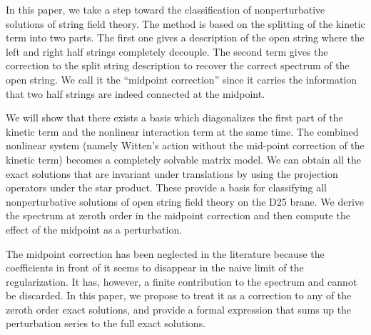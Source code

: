 \documentclass[a4paper,aps,preprint,nofootinbib,eqsecnum]{revtex4}
\begin{document}
In this paper, we take a step toward the classification of
nonperturbative solutions of string field theory. The method is
based on the splitting of the kinetic term into two parts. The
first one gives a description of the open string where the left
and right half strings completely decouple. The second term gives
the correction to the split string description to recover the
correct spectrum of the open string. We call it the ``midpoint
correction'' since it carries the information that two half
strings are indeed connected at the midpoint.

We will show that there exists a basis which diagonalizes the first part of
the kinetic term and the nonlinear interaction term at the same time. The
combined nonlinear system (namely Witten's action without the mid-point
correction of the kinetic term) becomes a completely solvable matrix model.
We can obtain all the exact solutions that are invariant under translations
by using the projection operators under the star product. These provide a
basis for classifying all nonperturbative solutions of open string field
theory on the D25 brane. We derive the spectrum at zeroth order in the
midpoint correction and then compute the effect of the midpoint as a
perturbation.

The midpoint correction has been neglected in the literature because the
coefficients in front of it seems to disappear in the naive limit of the
regularization. It has, however, a finite contribution to the spectrum and
cannot be discarded. In this paper, we propose to treat it as a correction
to any of the zeroth order exact solutions, and provide a formal expression
that sums up the perturbation series to the full exact solutions.
\end{document}
